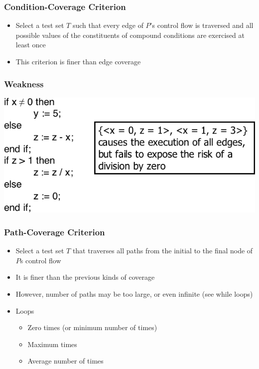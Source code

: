 \documentclass[t,12pt,numbers,fleqn]{beamer}
\begin{document}

\begin{frame}
\frametitle{Condition-Coverage Criterion}

\begin{itemize}
\item Select a test set $T$ such that every edge of $P$'s control flow is traversed and all possible values of the
constituents of compound conditions are exercised at least once
\item This criterion is finer than edge coverage
\end{itemize}

\end{frame}


\begin{frame}
\frametitle{Weakness}

\includegraphics[scale=0.5]{../Figures/WeaknessConditionCoverage.png}

\end{frame}


\begin{frame}
\frametitle{Path-Coverage Criterion}

\begin{itemize}
\item Select a test set $T$ that traverses all paths from the initial to the final node of $P$s control flow
\item It is finer than the previous kinds of coverage
\item However, number of paths may be too large, or even infinite (see while loops)
\item Loops
\begin{itemize}
\item Zero times (or minimum number of times)
\item Maximum times
\item Average number of times
\end{itemize}
\end{itemize}

\end{frame}
\end{document}
